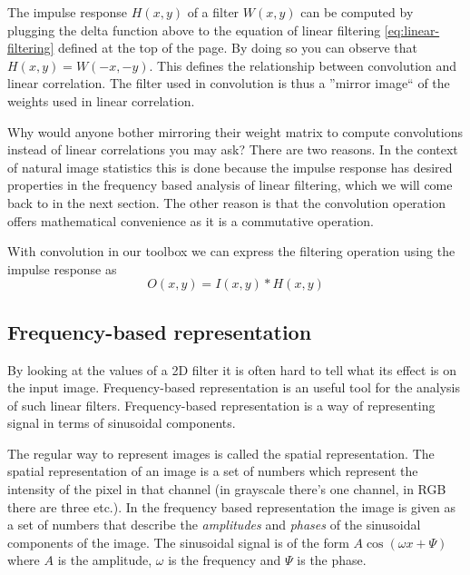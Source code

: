 \documentclass[]{article}
\begin{document}
The impulse response $H(x,y)$ of a filter $W(x,y)$ can be computed by plugging
the delta function above to the equation of linear filtering
\ref{eq:linear-filtering} defined at the top of the page. By doing so you can
observe that $H(x,y) = W(-x,-y)$. This defines the relationship between
convolution and linear correlation. The filter used in convolution is thus a
''mirror image`` of the weights used in linear correlation.

Why would anyone bother mirroring their weight matrix to compute convolutions
instead of linear correlations you may ask? There are two reasons. In the
context of natural image statistics this is done because the impulse response
has desired properties in the frequency based analysis of linear filtering,
which we will come back to in the next section. The other reason is that the
convolution operation offers mathematical convenience as it is a commutative
operation\cite{deeplearningbook}.

With convolution in our toolbox we can express the filtering operation using
the impulse response as
\begin{equation}
  O(x,y) = I(x,y) \ast H(x,y)
\end{equation}

\subsection{Frequency-based representation}
\label{frequency-based-representation}
By looking at the values of a 2D filter it is often hard to tell what its
effect is on the input image. Frequency-based representation is an useful tool
for the analysis of such linear filters. Frequency-based representation is a
way of representing signal in terms of sinusoidal components.

The regular way to represent images is called the spatial representation. The
spatial representation of an image is a set of numbers which represent the
intensity of the pixel in that channel (in grayscale there's one channel, in
RGB there are three etc.). In the frequency based representation the image is
given as a set of numbers that describe the \textit{amplitudes} and
\textit{phases} of the sinusoidal components of the image. The sinusoidal
signal is of the form $A \cos(\omega x + \Psi)$ where $A$ is the amplitude,
$\omega$ is the frequency and $\Psi$ is the phase.
\end{document}
